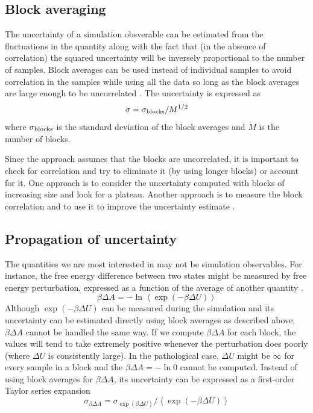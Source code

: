 \subsection{Block averaging}

The uncertainty of a simulation obsverable can be estimated from the fluctuations in the quantity along with the fact that (in the absence of correlation) the squared uncertainty will be inversely proportional to the number of samples.  Block averages can be used instead of individual samples to avoid correlation in the samples while using all the data so long as the block averages are large enough to be uncorrelated \cite{Friedberg1970,FrenkelSmit2002}.  The uncertainty is expressed as
\begin{equation}
  \sigma = \sigma_{\rm blocks}/M^{1/2}
\end{equation}
where $\sigma_{\rm blocks}$ is the standard deviation of the block averages and $M$ is the number of blocks.

Since the approach assumes that the blocks are uncorrelated, it is important to check for correlation and try to eliminate it (by using longer blocks) or account for it.  One approach is to consider the uncertainty computed with blocks of increasing size and look for a plateau.  Another approach is to measure the block correlation and to use it to improve the uncertainty estimate \cite{Kolafa1986}.

\subsection{Propagation of uncertainty}

The quantities we are most interested in may not be simulation observables.  For instance, the free energy difference between two states might be measured by free energy perturbation, expressed as a function of the average of another quantity \cite{Taylor1997}.
\begin{equation}
\beta \Delta A = -\ln \left< \exp \left(-\beta \Delta U\right) \right>
\end{equation}
Although $\exp(-\beta \Delta U)$ can be measured during the simulation and its uncertainty can be estimated directly using block averages as described above, $\beta \Delta A$ cannot be handled the same way.  If we compute $\beta \Delta A$ for each block, the values will tend to take extremely positive whenever the perturbation does poorly (where $\Delta U$ is consistently large).  In the pathological case, $\Delta U$ might be $\infty$ for every sample in a block and the $\beta \Delta A=-\ln 0$ cannot be computed. Instead of using block averages for $\beta \Delta A$, its uncertainty can be expressed as a first-order Taylor series expansion
\begin{equation}
  \sigma_{\beta \Delta A} = \sigma_{\exp(\beta \Delta U)} / \left< \exp \left(-\beta \Delta U\right) \right>
  \label{eq:propagation_bDA}
\end{equation}

